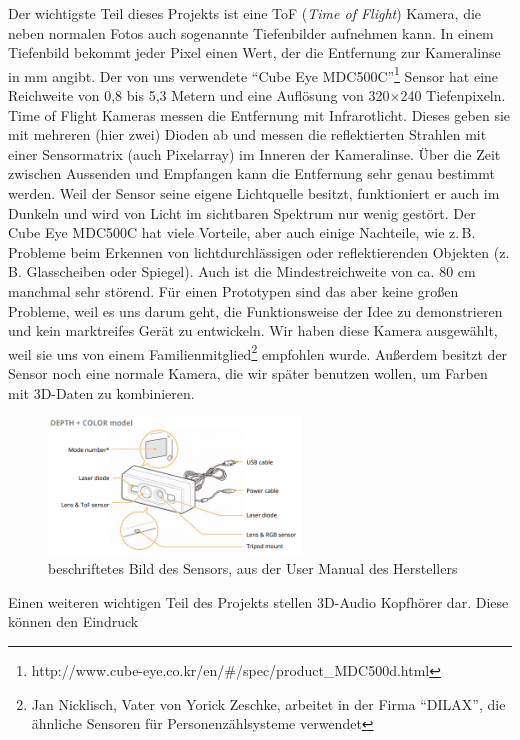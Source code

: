 \documentclass[a4paper,12pt,ngerman]{scrartcl}
\begin{document}
Der wichtigste Teil dieses Projekts ist eine ToF (\textit{Time of Flight}) Kamera, die neben normalen Fotos 
auch sogenannte Tiefenbilder aufnehmen kann.
In einem Tiefenbild bekommt jeder Pixel einen Wert, der die Entfernung zur Kameralinse in mm angibt.
Der von uns verwendete \enquote{Cube Eye MDC500C}\footnote{http://www.cube-eye.co.kr/en/\#/spec/product\_MDC500d.html}
Sensor hat eine Reichweite von 0,8 bis 5,3 Metern und eine Auflösung von 320$\times$240 Tiefenpixeln. 
Time of Flight Kameras messen die Entfernung mit Infrarotlicht. Dieses geben sie mit mehreren (hier zwei) Dioden
ab und messen die reflektierten Strahlen mit einer Sensormatrix (auch Pixelarray) im Inneren der Kameralinse. 
Über die Zeit zwischen 
Aussenden und Empfangen kann die Entfernung sehr genau bestimmt werden.
Weil der Sensor seine eigene Lichtquelle besitzt, funktioniert er auch im Dunkeln und wird von Licht im 
sichtbaren Spektrum nur wenig gestört. Der Cube Eye MDC500C hat viele Vorteile, aber auch einige Nachteile, wie z.\,B. 
Probleme beim Erkennen von lichtdurchlässigen oder reflektierenden Objekten (z.\,B. Glasscheiben oder Spiegel). 
Auch ist die Mindestreichweite von ca. 80 cm manchmal sehr störend. Für einen Prototypen sind das aber keine großen
Probleme, weil es uns darum geht, die Funktionsweise der Idee zu demonstrieren und kein marktreifes
Gerät zu entwickeln. Wir haben diese Kamera ausgewählt, weil sie uns von einem 
Familienmitglied\footnote{Jan Nicklisch, Vater von Yorick Zeschke, arbeitet in der Firma
	\enquote{DILAX}, die ähnliche Sensoren für Personenzählsysteme verwendet} 
empfohlen wurde. Außerdem besitzt der Sensor noch eine normale Kamera, die wir später benutzen wollen, um Farben mit 
3D-Daten zu kombinieren.
\begin{figure}[H]
	\centering
	\includegraphics[width=0.6\textwidth]{cube_eye}
	\caption{beschriftetes Bild des Sensors, aus der User Manual des Herstellers}
	\label{cube_eye_sensor}
\end{figure} \par
Einen weiteren wichtigen Teil des Projekts stellen 3D-Audio Kopfhörer dar. Diese können den Eindruck
\end{document}
